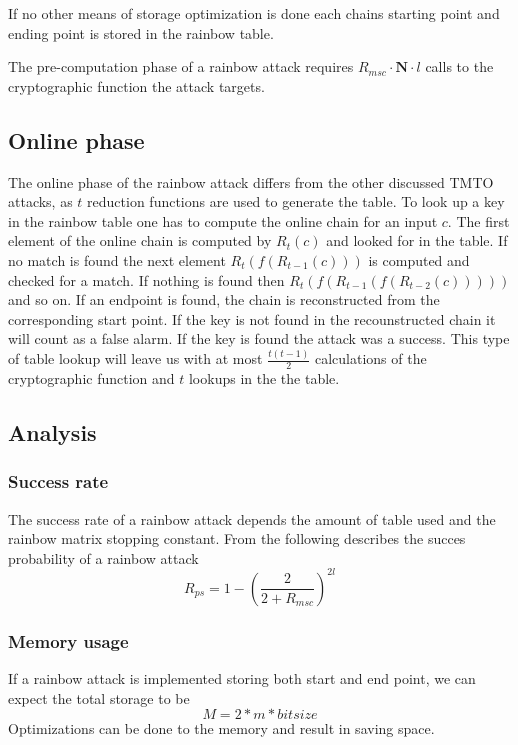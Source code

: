 If no other means of storage optimization is done each chains
starting point and ending point is stored in the rainbow table.

The pre-computation phase of a rainbow attack requires
$R_{msc} \cdot \textbf{N} \cdot l$ calls to the cryptographic function the attack targets.

\subsection{Online phase}
\label{sec:onlinerb}

The online phase of the rainbow attack differs from the other
discussed TMTO attacks, as $t$ reduction functions are used to
generate the table. To look up a key in the rainbow table one has to
compute the online chain for an input $c$. The first element of
the online chain is computed by $R_t(c)$ and looked for in the
table. If no match is found the next element $R_t(f(R_{t-1}(c)))$ is
computed and checked for a match. If nothing is found then $R_t(f(R_{t-1}(f(R_{t-2}(c)))))$
and so on. If an endpoint is found, the chain is reconstructed from the corresponding start
point. If the key is not found in the recounstructed chain it will count
as a false alarm. If the key is found the attack was a
success. This type of table lookup will leave us with at most
$\frac{t(t - 1)}{2}$ calculations of the cryptographic function and
$t$ lookups in the the table.
\subsection{Analysis}

\subsubsection{Success rate}

The success rate of a rainbow attack depends the amount of table used
and the rainbow matrix stopping constant. From \cite[Proposition
29]{176} the following describes the succes probability of a rainbow attack
\[R_{ps} = 1 - \left( \frac{2}{2+R_{msc}} \right)^{2l}\]

\subsubsection{Memory usage}

If a rainbow attack is implemented storing both start and end point,
we can expect the total storage to be 
\[M = 2 * m * bitsize\]
Optimizations can be done to the memory and result in saving
space. 




